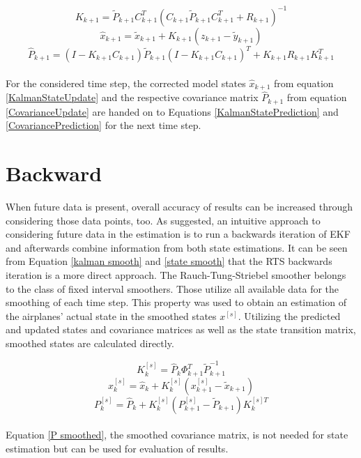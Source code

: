 \documentclass[%
	pdftex,
	12pt,								%
	parskip=half,				%
	headheight = 12pt,	%
	headsepline,				%
	footsepline,				%
	footheight = 16pt,	%
	DIV=calc,						%
	BCOR=8mm,						%
	headinclude=false,	%
	footinclude=false,	%
]{scrreprt}						%
\begin{document}
\begin{equation}
K_{k+1} = \widetilde{P}_{k+1}C_{k+1}^T (C_{k+1}\widetilde{P}_{k+1}C_{k+1}^T + R_{k+1})^{-1} \label{KalmanGain}
\end{equation}
\begin{equation}
\widehat{x} _{k+1} = \widetilde{x} _{k+1} + K_{k+1}(z_{k+1} - \widetilde{y}_{k+1}) \label{KalmanStateUpdate}
\end{equation}
\begin{equation}
\widehat{P} _{k+1} = (I - K_{k+1}C_{k+1})\widetilde{P}_{k+1}(I - K_{k+1}C_{k+1})^T + K_{k+1}R_{k+1}K_{k+1}^T \label{CovarianceUpdate}
\end{equation}\\
For the considered time step, the corrected model states $\widehat{x} _{k+1}$ from equation \ref{KalmanStateUpdate} and the respective covariance matrix $ \widehat{P}_{k+1} $ from equation \ref{CovarianceUpdate} are handed on to Equations \ref{KalmanStatePrediction} and \ref{CovariancePrediction} for the next time step. \newline



\section{Backward}
When future data is present, overall accuracy of results can be increased through considering those data points, too. As \cite{JS_SA} suggested, an intuitive approach to considering future data in the estimation is to run a backwards iteration of EKF and afterwards combine information from both state estimations. It can be seen from Equation \ref{kalman smooth} and \ref{state smooth} that the RTS backwards iteration is a more direct approach. The Rauch-Tung-Striebel smoother belongs to the class of fixed interval smoothers. Those utilize all available data for the smoothing of each time step. This property was used to obtain an estimation of the airplanes' actual state in the smoothed states $x^{[s]}$. \cite{RTS_application}  Utilizing the predicted and updated states and covariance matrices as well as the state transition matrix, smoothed states are calculated directly.

\begin{equation}
K_{k}^{[s]} = \widehat{P}_{k}\Phi_{k+1}^T\widetilde{P}_{k+1}^{-1} \label{kalman smooth}
\end{equation}
\begin{equation}
{x} _{k}^{[s]} = \widehat{x} _{k} + K_{k}^{[s]}({x} _{k+1}^{[s]} - \widetilde{x}_{k+1}) \label{state smooth}
\end{equation}
\begin{equation}
P_{k}^{[s]} = \widehat{P}_{k} + K_{k}^{[s]}(P_{k+1}^{[s]} - \widetilde{P}_{k+1})K_{k}^{[s]T}\label{P smoothed}
\end{equation}\\

Equation \ref{P smoothed}, the smoothed covariance matrix, is not needed for state estimation but can be used for evaluation of results.
\end{document}
